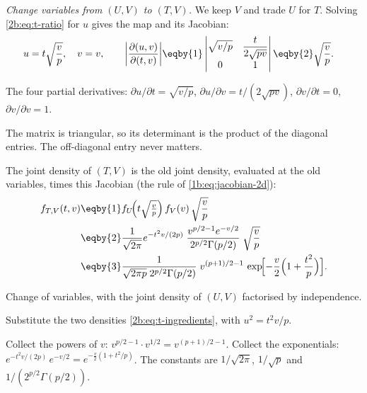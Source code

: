 \emph{Change variables from $(U,V)$ to $(T,V)$.} We keep $V$ and trade $U$ for $T$.
Solving \eqref{2b:eq:t-ratio} for $u$ gives the map and its Jacobian:
\begin{align}
  u=t\sqrt{\frac vp},\quad v=v,
  \qquad
  \left|\frac{\partial(u,v)}{\partial(t,v)}\right|
  &\eqby{1} \left|\begin{matrix}\sqrt{v/p} & \dfrac{t}{2\sqrt{pv}}\\[6pt] 0 & 1\end{matrix}\right|
   \eqby{2} \sqrt{\frac vp}.
  \label{2b:eq:t-jacobian}
\end{align}
\begin{explain}
  \item The four partial derivatives: $\partial u/\partial t=\sqrt{v/p}$, $\partial u/\partial v=t/(2\sqrt{pv})$, $\partial v/\partial t=0$, $\partial v/\partial v=1$.
  \item The matrix is triangular, so its determinant is the product of the diagonal entries. The off-diagonal entry never matters.
\end{explain}
The joint density of $(T,V)$ is the old joint density, evaluated at the old variables,
times this Jacobian (the rule of \cref{1b:eq:jacobian-2d}):
\begin{align}
  f_{T,V}(t,v)
  &\eqby{1} f_U\!\Bigl(t\sqrt{\tfrac vp}\Bigr)\,f_V(v)\,\sqrt{\frac vp} \nonumber\\
  &\eqby{2} \frac{1}{\sqrt{2\pi}}e^{-t^2v/(2p)}\;
            \frac{v^{p/2-1}e^{-v/2}}{2^{p/2}\Gamma(p/2)}\;\sqrt{\frac vp} \nonumber\\
  &\eqby{3} \frac{1}{\sqrt{2\pi p}\;2^{p/2}\Gamma(p/2)}\;
            v^{(p+1)/2-1}\,
            \exp\!\Bigl[-\frac v2\Bigl(1+\frac{t^2}{p}\Bigr)\Bigr].
  \label{2b:eq:t-joint}
\end{align}
\begin{explain}
  \item Change of variables, with the joint density of $(U,V)$ factorised by independence.
  \item Substitute the two densities \eqref{2b:eq:t-ingredients}, with $u^2=t^2v/p$.
  \item Collect the powers of $v$: $v^{p/2-1}\cdot v^{1/2}=v^{(p+1)/2-1}$. Collect the exponentials: $e^{-t^2v/(2p)}\,e^{-v/2}=e^{-\frac v2(1+t^2/p)}$. The constants are $1/\sqrt{2\pi}$, $1/\sqrt p$ and $1/(2^{p/2}\Gamma(p/2))$.
\end{explain}

